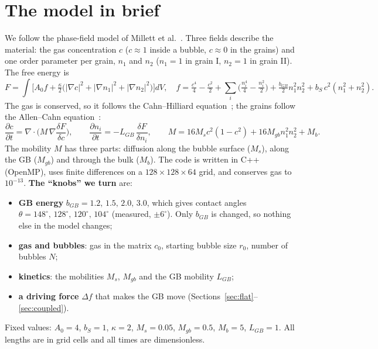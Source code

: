 \documentclass[11pt,a4paper]{article}
\newcommand{\bGB}{b_{GB}}
\begin{document}
\section{The model in brief}

We follow the phase-field model of Millett et al.~\cite{Millett2012}. Three
fields describe the material: the gas concentration $c$ ($c\approx1$ inside a
bubble, $c\approx0$ in the grains) and one order parameter per grain, $n_1$ and
$n_2$ ($n_1=1$ in grain I, $n_2=1$ in grain II). The free energy is
\begin{equation}
  F=\int\Big[A_0 f+\tfrac{\kappa}{2}\big(|\nabla c|^2+|\nabla n_1|^2+|\nabla n_2|^2\big)\Big]dV,\quad
  f=\tfrac{c^4}{4}-\tfrac{c^2}{2}+\sum_{i}\Big(\tfrac{n_i^4}{4}-\tfrac{n_i^2}{2}\Big)
    +\tfrac{\bGB}{2}n_1^2n_2^2+b_S\,c^2(n_1^2+n_2^2).
\end{equation}
The gas is conserved, so it follows the Cahn--Hilliard
equation~\cite{CahnHilliard1958}; the grains follow the Allen--Cahn
equation~\cite{AllenCahn1979}:
\begin{equation}
  \frac{\partial c}{\partial t}=\nabla\cdot\Big(M\,\nabla\frac{\delta F}{\delta c}\Big),\qquad
  \frac{\partial n_i}{\partial t}=-L_{GB}\,\frac{\delta F}{\delta n_i},\qquad
  M=16M_s c^2(1-c^2)+16M_{gb}n_1^2n_2^2+M_b .
\end{equation}
The mobility $M$ has three parts: diffusion along the bubble surface ($M_s$),
along the GB ($M_{gb}$) and through the bulk ($M_b$). The code is written in
C++ (OpenMP), uses finite differences on a $128\times128\times64$ grid, and
conserves gas to $10^{-13}$. \textbf{The ``knobs'' we turn} are:
\begin{itemize}
  \item \textbf{GB energy} $\bGB=1.2,\,1.5,\,2.0,\,3.0$, which gives contact angles
        $\theta=148^\circ,\,128^\circ,\,120^\circ,\,104^\circ$ (measured, $\pm6^\circ$).
        Only $\bGB$ is changed, so nothing else in the model changes;
  \item \textbf{gas and bubbles}: gas in the matrix $c_0$, starting bubble size
        $r_0$, number of bubbles $N$;
  \item \textbf{kinetics}: the mobilities $M_s$, $M_{gb}$ and the GB mobility $L_{GB}$;
  \item \textbf{a driving force} $\Delta f$ that makes the GB move (Sections~\ref{sec:flat}--\ref{sec:coupled}).
\end{itemize}
Fixed values: $A_0=4$, $b_S=1$, $\kappa=2$, $M_s=0.05$, $M_{gb}=0.5$, $M_b=5$,
$L_{GB}=1$. All lengths are in grid cells and all times are dimensionless.
\end{document}
